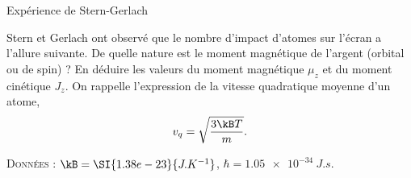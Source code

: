 \begin{exo}[PC][2][TD]{Expérience de Stern-Gerlach}
\begin{quest}
		\item Stern et Gerlach ont observé que le nombre d'impact d'atomes sur l'écran a l'allure suivante. De quelle nature est le moment magnétique de l'argent (orbital ou de spin) ? En déduire les valeurs du moment magnétique $\mu_z$ et du moment cinétique $J_z$. On rappelle l'expression de la vitesse quadratique moyenne d'un atome,
		\begin{equation}
			v_q = \sqrt{\frac{3 \kB T}{m}}.
		\end{equation}
	\end{quest}
	\textsc{Données :} $\kB= \SI{1.38e-23}{J.K^{-1}}$, $\hbar = \SI{1.05e-34}{J.s}$.

\end{exo}

